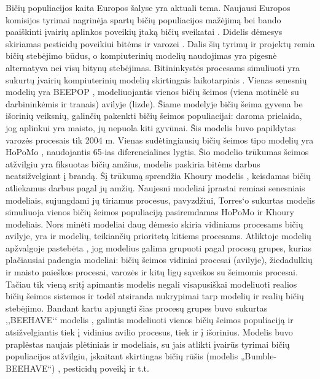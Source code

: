 \documentclass{VUMIFKompMagistrinis}
\begin{document}

Bičių populiacijos kaita Europos šalyse \cite{LHC16} yra aktuali tema. Naujausi Europos komisijos tyrimai nagrinėja spartų bičių populiacijos mažėjimą bei bando paaiškinti įvairių aplinkos poveikių įtaką bičių sveikatai \cite{EFSA17a}. Didelis dėmesys skiriamas pesticidų poveikiui bitėms \cite{EFSA18} ir varozei \cite{EFSA17a}.  Dalis šių tyrimų ir projektų remia bičių stebėjimo būdus, o kompiuterinių modelių naudojimas yra pigesnė alternatyva nei visų bitynų stebėjimas. 
Bitininkystės procesams simuliuoti yra sukurtų įvairių kompiuterinių modelių skirtingais laikotarpiais \cite{BTO13}. Vienas senesnių modelių yra BEEPOP \cite{DRL89}, modeliuojantis vienos bičių šeimos (viena motinėlė su darbininkėmis ir tranais) avilyje (lizde). Šiame modelyje bičių šeima gyvena be išorinių veiksnių, galinčių pakenkti bičių šeimos populiacijai: daroma prielaida, jog aplinkui yra maisto, jų nepuola kiti gyvūnai. Šis modelis buvo papildytas varozės procesais \cite{HoC05} tik 2004 m. Vienas sudėtingiausių bičių šeimos tipo modelių yra HoPoMo \cite{ScC07}, naudojantis 65-ias diferencialines lygtis. Šio modelio trūkumas šeimos atžvilgiu yra fiksuotas bičių amžius, modelis paskiria bitėms darbus neatsižvelgiant į brandą. Šį trūkumą sprendžia Khoury modelis \cite{KBM13}, keisdamas bičių atliekamus darbus pagal jų amžių. Naujesni modeliai įprastai remiasi senesniais modeliais, sujungdami jų tiriamus procesus, pavyzdžiui, Torres‘o \cite{TRR15} sukurtas modelis simuliuoja vienos bičių šeimos populiaciją pasiremdamas HoPoMo ir Khoury modeliais. 
Nors minėti modeliai daug dėmesio skiria vidiniams procesams bičių avilyje, yra ir modelių, teikiančių prioritetą kitiems procesams. Atliktoje modelių apžvalgoje pastebėta \cite{BTO13}, jog modelius galima grupuoti pagal procesų grupes, kurias plačiausiai padengia modeliai: bičių šeimos vidiniai procesai (avilyje), žiedadulkių ir maisto paieškos procesai, varozės ir kitų ligų sąveikos su šeimomis procesai. Tačiau tik vieną sritį apimantis modelis negali visapusiškai modeliuoti realios bičių šeimos sistemos ir todėl atsiranda nukrypimai tarp modelių ir realių bičių stebėjimo. Bandant kartu apjungti šias procesų grupes buvo sukurtas ,,BEEHAVE‘‘ modelis \cite{BGT14}, galintis modeliuoti vienos bičių šeimos populiaciją ir atsižvelgiantis tiek į vidinius avilio procesus, tiek ir į išorinius. Modelis buvo praplėstas naujais plėtiniais ir modeliais, su jais atlikti įvairūs tyrimai bičių populiacijos atžvilgiu, įskaitant skirtingas bičių rūšis (modelis „Bumble-BEEHAVE“) \cite{BDP18}, pesticidų poveikį \cite{RBT17} ir t.t.
\end{document}
